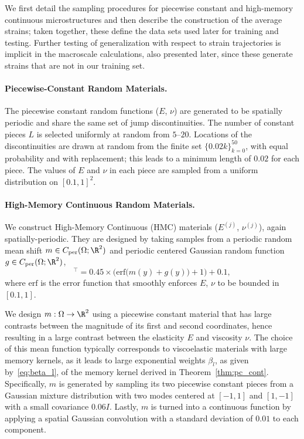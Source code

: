 \documentclass[letterpaper,11pt]{article}
\begin{document}
We first detail the sampling procedures for piecewise constant and high-memory continuous microstructures and then describe the construction of the average strains; taken together, these define the data sets used later for training and testing. Further
testing of generalization with respect to strain trajectories is implicit in the macroscale calculations, also presented later, since these generate strains
that are not in our training set.
\vspace{-10pt}
\paragraph{Piecewise-Constant Random Materials.} The piecewise constant random functions ($E$, $\nu$) are generated to be spatially periodic and share the same set of jump discontinuities. The number of constant pieces $L$ is selected uniformly at random from $5$--$20$. Locations of the discontinuities are drawn at random from the finite set $\{0.02k\}_{k=0}^{50}$, with equal probability and with replacement; this leads to a minimum length of $0.02$ for each piece. The values of $E$ and $\nu$ in each piece are sampled from a uniform distribution on $[0.1, 1]^2$.

\paragraph{High-Memory Continuous Random Materials.} We construct High-Memory Continuous (HMC) materials ($E^{(j)}$, $\nu^{(j)}$), again spatially-periodic. They are designed by taking samples from a periodic random mean shift $m \in C_{\text{per}}(\Omega;\R^2)$ and periodic centered Gaussian random function $g \in C_{\text{per}}(\Omega;\R^2)$,
\begin{equation}
    [E(y), \nu(y)]^{\top} = 0.45\times \Big(\text{erf}\Big(m(y) + g(y)\Big) + 1\Big) + 0.1,
\end{equation}
where $\text{erf}$ is the error function that smoothly enforces $E$, $\nu$ to be bounded in $[0.1, 1]$.

We design $m: \Omega \to \R^2$ using a piecewise constant material that has large contrasts between the magnitude of its first and second coordinates, hence resulting in a large contrast between the elasticity $E$ and viscosity $\nu$. The choice of this mean function typically corresponds to viscoelastic materials with large memory kernels, as it leads to large exponential weights $\beta_l$, as given 
by~\eqref{eq:beta_l}, of the memory kernel derived in Theorem~\ref{thm:pc_cont}. Specifically, $m$ is generated by sampling its two piecewise constant pieces from a Gaussian mixture distribution with two modes centered at $[-1, 1]$ and $[1, -1]$ with a small covariance $0.06 I$. Lastly, $m$ is turned into a continuous function by applying a spatial Gaussian convolution with a standard deviation of $0.01$ to each component.
\end{document}

